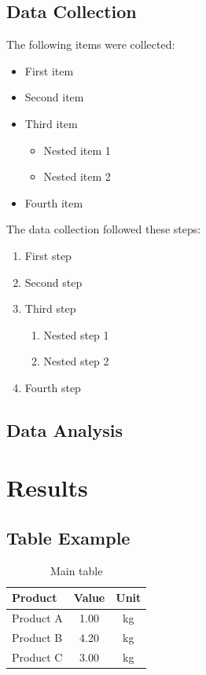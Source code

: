 \documentclass[lineno]{biometrika}
\begin{document}
\lipsum[10-11]

\subsection{Data Collection}

\lipsum[4]

The following items were collected:

\begin{itemize}
	\item First item
	\item Second item
	\item Third item
	\begin{itemize}
		\item Nested item 1
		\item Nested item 2
	\end{itemize}
	\item Fourth item
\end{itemize}

The data collection followed these steps:

\begin{enumerate}
	\item First step
	\item Second step
	\item Third step
	\begin{enumerate}
		\item Nested step 1
		\item Nested step 2
	\end{enumerate}
	\item Fourth step
\end{enumerate}

\subsection{Data Analysis}

\lipsum[5]

\section{Results}

\lipsum[6]

\subsection{Table Example}

\begin{table}[h]
	\centering
	\caption{Main table}
	\begin{tabular}{lcc}
		\toprule
		\textbf{Product} & \textbf{Value} & \textbf{Unit} \\
		\midrule
		Product A & 1.00 & kg \\
		Product B & 4.20 & kg \\
		Product C & 3.00 & kg \\
		\bottomrule
	\end{tabular}
	\label{tab:sample}
\end{table}
\end{document}

